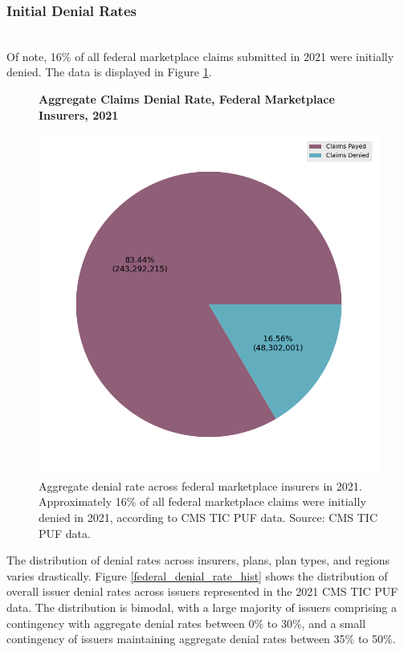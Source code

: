 \documentclass[psamsfonts]{amsart}
\theoremstyle{plain}
\theoremstyle{definition}
\theoremstyle{remark}
\begin{document}
\subsubsection{Initial Denial Rates}
\hfill\\

Of note, 16\% of all federal marketplace claims submitted in 2021 were initially denied. The data is displayed in Figure \ref{federal_denial_rate}.\\

\begin{figure}
	\centering
	\textbf{Aggregate Claims Denial Rate, Federal Marketplace Insurers, 2021}\par\medskip
	\includegraphics[width=0.85\columnwidth]{images/cms_puf/overall_denial_pie.png}
	\caption{Aggregate denial rate across federal marketplace insurers in 2021. Approximately 16\% of all federal marketplace claims were initially denied in 2021, according to CMS TIC PUF data. Source: CMS TIC PUF data.}
	\label{federal_denial_rate}
\end{figure}


The distribution of denial rates across insurers, plans, plan types, and regions varies drastically. Figure \ref{federal_denial_rate_hist} shows the distribution of overall issuer denial rates across issuers represented in the 2021 CMS TIC PUF data. The distribution is bimodal, with a large majority of issuers comprising a contingency with aggregate denial rates between 0\% to 30\%, and a small contingency of issuers maintaining aggregate denial rates between 35\% to 50\%.
\end{document}
